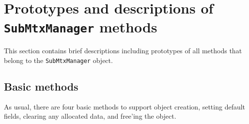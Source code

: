 \par
\section{Prototypes and descriptions of {\tt SubMtxManager} methods}
\label{section:SubMtxManager:proto}
\par
This section contains brief descriptions including prototypes
of all methods that belong to the {\tt SubMtxManager} object.
\par
\subsection{Basic methods}
\label{subsection:SubMtxManager:proto:basics}
\par
As usual, there are four basic methods to support object creation,
setting default fields, clearing any allocated data, and free'ing
the object.
\par
